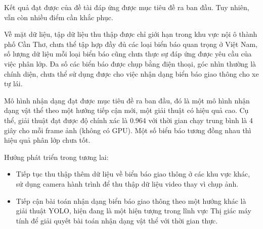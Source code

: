 \documentclass[../thesis.tex]{subfiles}
\begin{document}
Kết quả đạt được của đề tài đáp ứng được mục tiêu đề ra ban đầu. Tuy nhiên, vẫn còn nhiều điểm cần khắc phục.

Về mặt dữ liệu, tập dữ liệu thu thập được chỉ giới hạn trong khu vực nội ô thành phố Cần Thơ, chưa thể tập hợp đầy đủ các loại biển báo quan trọng ở Việt Nam, số lượng dữ liệu mỗi loại biển báo cũng chưa thực sự đáp ứng được yêu cầu của việc phân lớp. Đa số các biển báo được chụp bằng điện thoại, góc nhìn thường là chính diện, chưa thể sử dụng được cho việc nhận dạng biển báo giao thông cho xe tự lái.

Mô hình nhận dạng đạt được mục tiêu đề ra ban đầu, đó là một mô hình nhận dạng vật thể theo một hướng tiếp cận mới, một giải thuật có hiệu quả cao. Cụ thể, giải thuật đạt được độ chính xác là 0.964 với thời gian chạy trung bình là 4 giây cho mỗi frame ảnh (không có GPU). Một số biển báo tương đồng nhau thì hiệu quả phân lớp chưa tốt.

Hướng phát triển trong tương lai:

\begin{itemize}
  \item Tiếp tục thu thập thêm dữ liệu về biển báo giao thông ở các khu vực khác, sử dụng camera hành trình để thu thập dữ liệu video thay vì chụp ảnh.
  \item Tiếp cận bài toán nhận dạng biển báo giao thông theo một hướng khác là giải thuật YOLO\cite{DBLP:journals/corr/RedmonDGF15}, hiện đang là một hiện tượng trong lĩnh vực Thị giác máy tính để giải quyết bài toán nhận dạng vật thể với thời gian thực.
\end{itemize}
\end{document}
